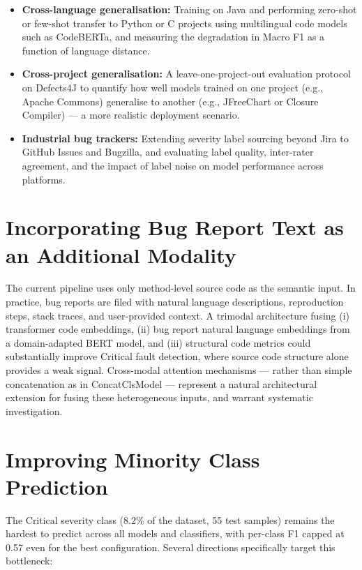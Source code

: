 \documentclass[12pt, a4paper]{report}
\begin{document}
\begin{itemize}
  \item \textbf{Cross-language generalisation:} Training on Java and
  performing zero-shot or few-shot transfer to Python or C projects using
  multilingual code models such as CodeBERTa, and measuring the degradation
  in Macro F1 as a function of language distance.
  \item \textbf{Cross-project generalisation:} A leave-one-project-out
  evaluation protocol on Defects4J to quantify how well models trained on one
  project (e.g., Apache Commons) generalise to another (e.g., JFreeChart or
  Closure Compiler) --- a more realistic deployment scenario.
  \item \textbf{Industrial bug trackers:} Extending severity label sourcing
  beyond Jira to GitHub Issues and Bugzilla, and evaluating label quality,
  inter-rater agreement, and the impact of label noise on model performance
  across platforms.
\end{itemize}

\section{Incorporating Bug Report Text as an Additional Modality}

The current pipeline uses only method-level source code as the semantic input.
In practice, bug reports are filed with natural language descriptions,
reproduction steps, stack traces, and user-provided context. A trimodal
architecture fusing (i) transformer code embeddings, (ii) bug report natural
language embeddings from a domain-adapted BERT model, and (iii) structural
code metrics could substantially improve Critical fault detection, where source
code structure alone provides a weak signal. Cross-modal attention mechanisms
--- rather than simple concatenation as in ConcatClsModel --- represent a
natural architectural extension for fusing these heterogeneous inputs, and
warrant systematic investigation.

\section{Improving Minority Class Prediction}

The Critical severity class (8.2\% of the dataset, 55 test samples) remains
the hardest to predict across all models and classifiers, with per-class F1
capped at 0.57 even for the best configuration. Several directions
specifically target this bottleneck:
\end{document}
